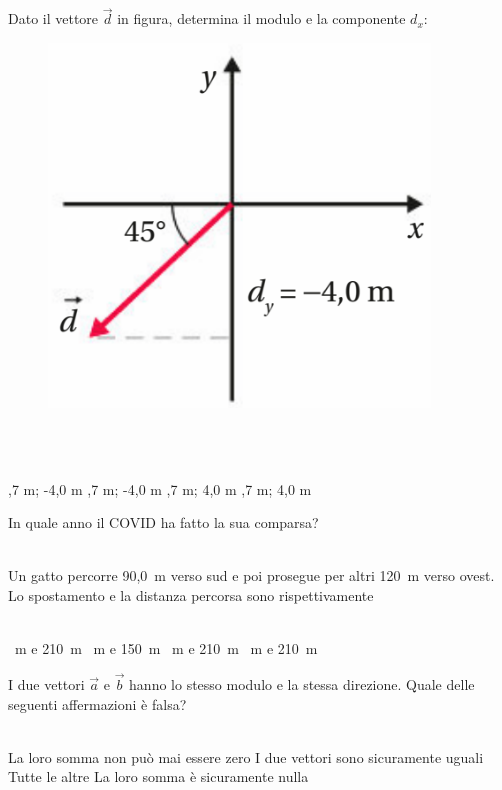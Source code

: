 \documentclass[a4paper,11pt]{exam}
\begin{document}
\begin{questions}
    
\question Dato il vettore $\vec{d}$ in figura, determina il modulo e la componente $d_x$: \begin{figure}[h!]   \begin{center}     \includegraphics[scale=0.35]{vettored.png}   \end{center} \end{figure}\\\
\begin{oneparchoices}
  ,7 m; -4,0 m
  ,7 m; -4,0 m
  ,7 m; 4,0 m
  \choice 5,7 m; 4,0 m
\end{oneparchoices}

    
\question In quale anno il COVID ha fatto la sua comparsa?\\\
\begin{oneparchoices}
  \choice 1943
\end{oneparchoices}

    
\question Un gatto percorre 90,0~m verso sud e poi prosegue per altri 120~m verso ovest. Lo spostamento e la distanza percorsa sono rispettivamente\\\
\begin{oneparchoices}
  \choice 30~m e 210~m
  ~m e 150~m
  \choice 210~m e 210~m
  \choice 150~m e 210~m
\end{oneparchoices}

    
\question I due vettori $\vec{a}$ e $\vec{b}$ hanno lo stesso modulo e la stessa direzione. Quale delle seguenti affermazioni è falsa?\\\
\begin{oneparchoices}
  \choice La loro somma non può mai essere zero
  \choice I due vettori sono sicuramente uguali
  \choice Tutte le altre
  \choice La loro somma è sicuramente nulla
\end{oneparchoices}


\end{questions}
\end{document}
